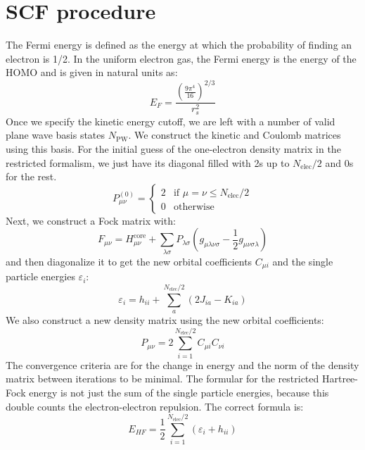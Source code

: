 \documentclass[12pt]{article}
\begin{document}
\section{SCF procedure}
The Fermi energy is defined as the energy at which the probability of finding an electron is 1/2. In the uniform electron gas, the Fermi energy is the energy of the HOMO and is given in natural units as:
\begin{equation}
    E_F = \frac{\left(\frac{9 \pi^4}{16}\right)^{2 / 3}}{r_s^2}
\end{equation}
Once we specify the kinetic energy cutoff, we are left with a number of valid plane wave basis states $N_{\text{PW}}$. We construct the kinetic and Coulomb matrices using this basis. For the initial guess of the one-electron density matrix in the restricted formalism, we just have its diagonal filled with 2s up to $N_\text{elec}/2$ and 0s for the rest.
\begin{equation}
    P^{(0)}_{\mu\nu} = \begin{cases}
    2 & \text{if } \mu = \nu \leq N_\text{elec}/2 \\
    0 & \text{otherwise}
    \end{cases}
\end{equation}
Next, we construct a Fock matrix with:
\begin{equation}
    F_{\mu\nu} = H_{\mu\nu}^{\text{core}} + \sum_{\lambda\sigma} P_{\lambda\sigma} \left(g_{\mu\lambda\nu\sigma} - \frac{1}{2}g_{\mu\nu\sigma\lambda}\right)
\end{equation}
and then diagonalize it to get the new orbital coefficients $C_{\mu i}$ and the single particle energies $\varepsilon_i$:
\begin{equation}
    \varepsilon_i = h_{ii} + \sum_{a}^{N_\text{elec}/2} \left(2J_{ia} - K_{ia}\right)
\end{equation}
 We also construct a new density matrix using the new orbital coefficients:
\begin{equation}
    P_{\mu\nu} = 2\sum_{i=1}^{N_\text{elec}/2} C_{\mu i} C_{\nu i}
\end{equation}
 The convergence criteria are for the change in energy and the norm of the density matrix between iterations to be minimal.
The formular for the restricted Hartree-Fock energy is not just the sum of the single particle energies, because this double counts the electron-electron repulsion. The correct formula is:
\begin{equation}
    E_{HF} = \frac{1}{2} \sum_{i=1}^{N_\text{elec}/2} \left(\varepsilon_i + h_{ii}\right)
\end{equation}
\end{document}
